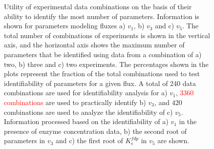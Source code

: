 \documentclass[10pt]{article}
\begin{document}
\begin{figure}[!tbhp]
	\caption{Utility of experimental data combinations on the basis of their ability to identify the most number of parameters. Information is shown for parameters modeling fluxes a) $v_1$, b) $v_3$ and c) $v_5$. The total number of combinations of experiments is shown in the vertical axis, and the horizontal axis shows the maximum number of parameters that be identified using data from a combination of a) two, b) three and c) two experiments. The percentages shown in the plots represent the fraction of the total combinations used to test identifiability of parameters for a given flux. A total of 240 data combinations are used for identifiability analysis for a) $v_1$, \textcolor{red}{3360 combinations} are used to practically identify b) $v_3$, and 420 combinations are used to analyze the identifiability of c) $v_5$. Information processed based on the identifiability of a) $v_1$ in the presence of enzyme concentration data, b) the second root of parameters in $v_3$ and c) the first root of $K_e^{fdp}$ in $v_5$ are shown.}\label{fig:other_data_utility}
\end{figure}	
\end{document}
